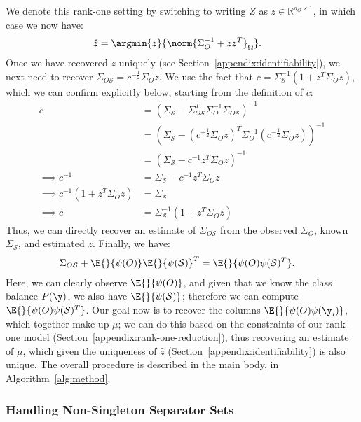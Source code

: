 \documentclass[letterpaper]{article}
\begin{document}
\begin{appendix}
We denote this rank-one setting by switching to writing $Z$ as $z \in \mathbb{R}^{d_O \times 1}$, in which case we now have:
\begin{align}
	\hat{z}
	&=
	\argmin{z}{ \norm{ \Sigma_O^{-1} + zz^T }_\Omega }.
\end{align}
Once we have recovered $z$ uniquely (see Section~\ref{appendix:identifiability}), we next need to recover $\Sigma_{O\mathcal{S}} = c^{-\frac12}\Sigma_O z$.
We use the fact that $c = \Sigma_{\mathcal{S}}^{-1}(1 + z^T\Sigma_Oz)$, which we can confirm explicitly below, starting from the definition of $c$:
\begin{align*}
	c
	&=
	\left( 
		\Sigma_{\mathcal{S}}
		- \Sigma_{O\mathcal{S}}^T\Sigma_O^{-1}\Sigma_{O\mathcal{S}}
	\right)^{-1}\\
	&=
	\left( 
		\Sigma_{\mathcal{S}}
		- (c^{-\frac12}\Sigma_O z)^T\Sigma_O^{-1}(c^{-\frac12}\Sigma_O z)
	\right)^{-1}\\
	&=
	\left( 
		\Sigma_{\mathcal{S}}
		- c^{-1} z^T\Sigma_Oz
	\right)^{-1}\\
	\implies
	c^{-1}
	&=
	\Sigma_{\mathcal{S}} - c^{-1} z^T\Sigma_Oz\\
	\implies
	c^{-1}\left(1 + z^T\Sigma_Oz\right)
	&=
	\Sigma_{\mathcal{S}}\\
	\implies
	c
	&=
	\Sigma_{\mathcal{S}}^{-1}\left(1 + z^T\Sigma_Oz\right)
\end{align*}
Thus, we can directly recover an estimate of $\Sigma_{O\mathcal{S}}$ from the observed $\Sigma_O$, known $\Sigma_{\mathcal{S}}$, and estimated $z$.
Finally, we have:
\begin{align}
	\Sigma_{O\mathcal{S}} + \E{}{ \psi(O) }\E{}{ \psi(\mathcal{S}) }^T
	&=
	\E{}{ \psi(O)\psi(\mathcal{S})^T }.
\end{align}
Here, we can clearly observe $\E{}{ \psi(O) }$, and given that we know the class balance $P(\y)$, we also have $\E{}{ \psi(\mathcal{S}) }$; therefore we can compute $\E{}{ \psi(O) \psi(\mathcal{S})^T }$.
Our goal now is to recover the columns $\E{}{ \psi(O)\psi(\y_i) }$, which together make up $\mu$; we can do this based on the constraints of our rank-one model (Section~\ref{appendix:rank-one-reduction}), thus recovering an estimate of $\mu$, which given the uniqueness of $\hat{z}$ (Section~\ref{appendix:identifiability}) is also unique.
The overall procedure is described in the main body, in Algorithm~\ref{alg:method}.

\subsubsection{Handling Non-Singleton Separator Sets}
\label{appendix:non-singleton-sep-sets}


\end{appendix}
\end{document}
